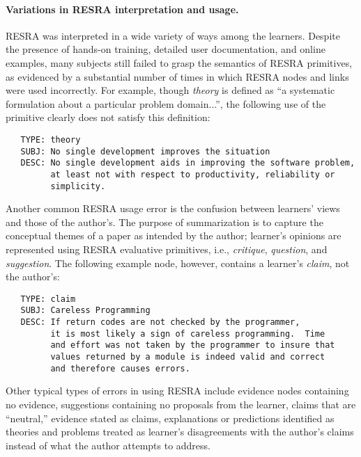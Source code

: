 \begin{quotation}
\end{quotation}


\paragraph{Variations in RESRA interpretation and usage.}

RESRA was interpreted in a wide variety of ways among the learners.
Despite the presence of hands-on training, detailed user documentation, and
online examples, many subjects still failed to grasp the semantics
of RESRA primitives, as evidenced by a substantial number of times in which
RESRA nodes and links were used incorrectly.  For example, though {\em
theory\/} is defined as ``a systematic formulation about a particular
problem domain...'', the following use of the primitive clearly does not
satisfy this definition:

\small
\begin{verbatim}
   TYPE: theory
   SUBJ: No single development improves the situation
   DESC: No single development aids in improving the software problem,
         at least not with respect to productivity, reliability or
         simplicity.
\end{verbatim}
\normalsize
{}

Another common RESRA usage error is the confusion between learners' views
and those of the author's. The purpose of summarization is to capture the
conceptual themes of a paper as intended by the author; learner's opinions
are represented using RESRA evaluative primitives, i.e., {\it critique},
{\it question}, and {\it suggestion}. The following example node, however,
contains a learner's {\it claim}, not the author's:

\small
\begin{verbatim}
   TYPE: claim
   SUBJ: Careless Programming
   DESC: If return codes are not checked by the programmer,
         it is most likely a sign of careless programming.  Time
         and effort was not taken by the programmer to insure that 
         values returned by a module is indeed valid and correct 
         and therefore causes errors.
\end{verbatim}
\normalsize
{}

Other typical types of errors in using RESRA include evidence nodes
containing no evidence, suggestions containing no proposals from the
learner, claims that are ``neutral,'' evidence stated as claims,
explanations or predictions identified as theories and problems treated as
learner's disagreements with the author's claims instead of what the author
attempts to address.


